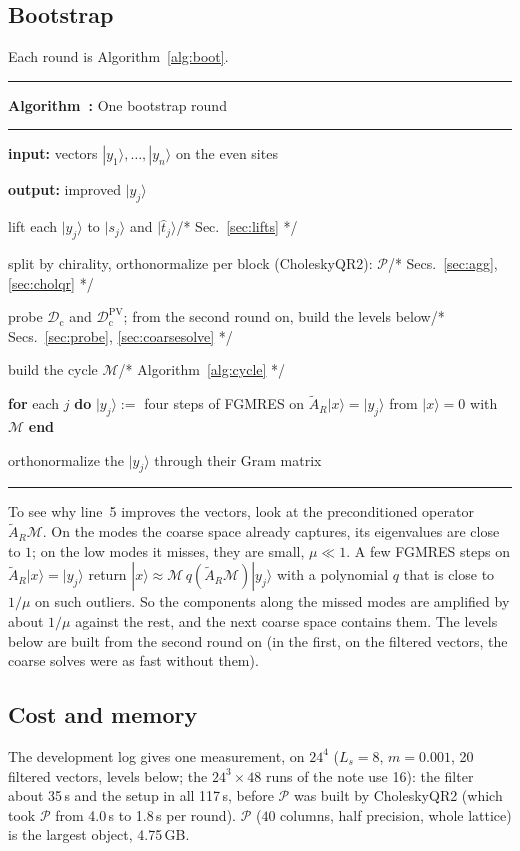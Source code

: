 \documentclass[11pt,a4paper]{article}
\numberwithin{equation}{section}
\newcommand{\AR}{\tilde A_{R}}
\newcommand{\Pro}{\mathcal P}
\newcommand{\Dc}{\mathcal D_{\mathrm c}}
\newcommand{\Dcpv}{\mathcal D_{\mathrm c}^{\mathrm{PV}}}
\newcounter{alg}
\newcounter{algline}
\newenvironment{algo}[2]{\par\medskip\noindent\begin{minipage}{\linewidth}\hrule\vspace{3pt}%
  \refstepcounter{alg}\label{#1}\textbf{Algorithm~\thealg:} #2\par\vspace{3pt}\hrule\vspace{3pt}\small
  \setlength{\parskip}{1pt}}{\par\vspace{3pt}\hrule\end{minipage}\par\medskip}
\newcommand{\AIn}[1]{\hspace*{1em}\textbf{input:} #1\par}
\newcommand{\AOut}[1]{\hspace*{1em}\textbf{output:} #1\par}
\newenvironment{steps}{\begin{list}{\scriptsize\arabic{algline}}{\usecounter{algline}%
  \setlength{\itemsep}{0pt}\setlength{\parsep}{0pt}\setlength{\topsep}{2pt}%
  \setlength{\leftmargin}{2.2em}\setlength{\labelwidth}{1.4em}}}{\end{list}}
\newcommand{\Cm}[1]{\hfill{\ttfamily\footnotesize /* #1 */}}
\newcommand{\kw}[1]{\textbf{#1}}
\begin{document}
\subsection{Bootstrap}
Each round is Algorithm~\ref{alg:boot}.
\begin{algo}{alg:boot}{One bootstrap round}
\AIn{vectors $|y_1\rangle,\dots,|y_n\rangle$ on the even sites}
\AOut{improved $|y_j\rangle$}
\begin{steps}
\item lift each $|y_j\rangle$ to $|s_j\rangle$ and $|\hat t_j\rangle$\Cm{Sec.~\ref{sec:lifts}}
\item split by chirality, orthonormalize per block (CholeskyQR2): $\Pro$\Cm{Secs.~\ref{sec:agg}, \ref{sec:cholqr}}
\item probe $\Dc$ and $\Dcpv$; from the second round on, build the levels below\Cm{Secs.~\ref{sec:probe}, \ref{sec:coarsesolve}}
\item build the cycle $\mathcal M$\Cm{Algorithm~\ref{alg:cycle}}
\item \kw{for} each $j$ \kw{do} $|y_j\rangle:=$ four steps of FGMRES on $\AR|x\rangle=|y_j\rangle$ from $|x\rangle=0$ with $\mathcal M$ \kw{end}
\item orthonormalize the $|y_j\rangle$ through their Gram matrix
\end{steps}
\end{algo}
To see why line~5 improves the vectors, look at the preconditioned operator $\AR\mathcal M$. On the
modes the coarse space already captures, its eigenvalues are close to $1$; on the low modes it
misses, they are small, $\mu\ll1$. A few FGMRES steps on $\AR|x\rangle=|y_j\rangle$ return
$|x\rangle\approx\mathcal M\,q(\AR\mathcal M)|y_j\rangle$ with a polynomial $q$ that is close to
$1/\mu$ on such outliers. So the components along the missed modes are amplified by about
$1/\mu$ against the rest, and the next coarse space contains them. The levels below are built from the second round on (in the first, on the filtered
vectors, the coarse solves were as fast without them).

\subsection{Cost and memory}
The development log gives one measurement, on $24^4$ ($L_s=8$, $m=0.001$, 20 filtered vectors,
levels below; the $24^3\times48$ runs of the note use 16): the filter about 35\,s and the setup in
all 117\,s, before $\Pro$ was built by CholeskyQR2 (which took $\Pro$ from 4.0\,s to 1.8\,s per
round). $\Pro$ ($40$ columns, half precision, whole lattice) is the largest object, 4.75\,GB.
\end{document}
